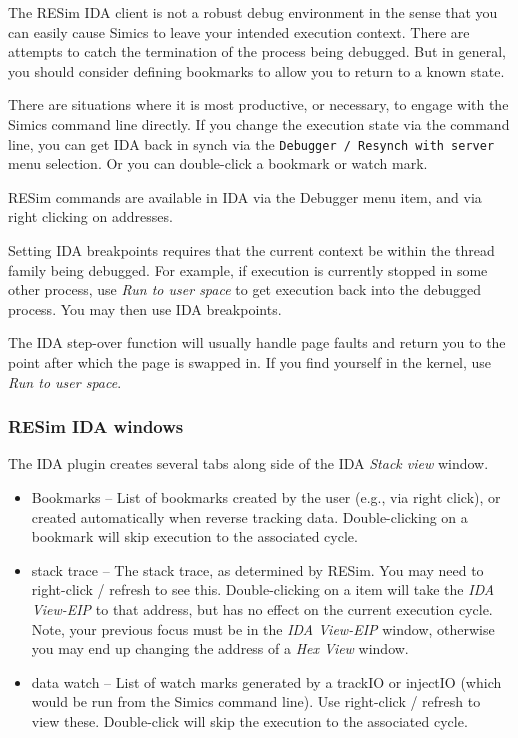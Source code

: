 \documentclass[titlepage]{article}
\begin{document}
The RESim IDA client is not a robust debug environment in the sense that you can easily cause Simics to leave your intended execution context.
There are attempts to catch the termination of the process being debugged.  But in general, you should consider defining bookmarks to allow you to
return to a known state.  

There are situations where it is most productive, or necessary, to engage with the Simics command line directly.  If you change the execution state
via the command line, you can get IDA back in synch via the {\tt Debugger / Resynch with server} menu selection.  Or you can double-click a bookmark
or watch mark.

RESim commands are available in IDA via the Debugger menu item, and via right clicking on addresses.  

Setting IDA breakpoints requires that the current context be within the thread family being debugged.  For example, if execution is currently 
stopped in some other process, use \textit{Run to user space} to get execution back into the debugged process.  You may then use IDA breakpoints.

The IDA step-over function will usually handle page faults and return you to the point after which the page is swapped in.  If you find yourself in
the kernel, use \textit{Run to user space}.


\subsubsection{RESim IDA windows}
The IDA plugin creates several tabs along side of the IDA \textit{Stack view} window.  
\begin{itemize}
\item Bookmarks -- List of bookmarks created by the user (e.g., via right click), or created automatically when reverse tracking data.
Double-clicking on a bookmark will skip execution to the associated cycle.
\item stack trace -- The stack trace, as determined by RESim.  You may need to right-click / refresh to see this.  Double-clicking on a item
will take the \textit{IDA View-EIP} to that address, but has no effect on the current execution cycle.  Note, your previous focus must be in
the \textit{IDA View-EIP} window, otherwise you may end up changing the address of a \textit{Hex View} window.
\item data watch -- List of watch marks generated by a trackIO or injectIO (which would be run from the Simics command line).  
Use right-click / refresh to view these.  Double-click will skip the execution to the associated cycle.
\end{itemize}
\end{document}
